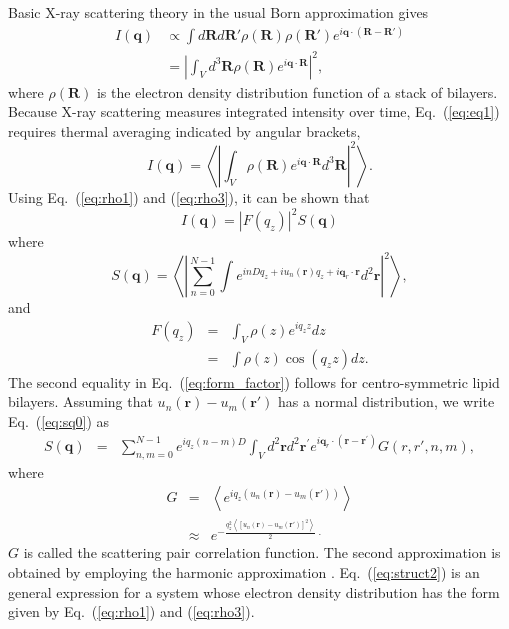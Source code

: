 Basic X-ray scattering theory in the usual Born approximation gives
\begin{align}
  I\left(\mathbf{q}\right) &\propto \int d\mathbf{R}d\mathbf{R}' 
  \rho(\mathbf{R})\rho (\mathbf{R}')e^{i\mathbf{q}\cdot (\mathbf{R}-\mathbf{R}')}\nonumber \\
  & = \left|\int_V d^{3}\mathbf{R} \rho \left(\mathbf{R}\right)e^{i\mathbf{q}\cdot \mathbf{R}}
  \right|^{2},\label{eq:eq1}
\end{align}
where $\rho \left(\mathbf{R}\right)$ is the electron density distribution
function of a stack of bilayers. 
Because X-ray scattering measures integrated intensity over time, 
Eq.~(\ref{eq:eq1}) requires thermal averaging indicated by angular brackets, 
\begin{equation}
  I\left(\mathbf{q}\right)=\left\langle \left|\int _{V}\rho \left(\mathbf{R}\right)e^{i\mathbf{q}\cdot \mathbf{R}}d^{3}\mathbf{R}\right|^{2}\right\rangle .\label{eq:int2}
\end{equation}
Using Eq.~(\ref{eq:rho1}) and (\ref{eq:rho3}), it can be shown that \cite{Liu03}
\begin{equation}
  I\left(\mathbf{q}\right) = \left|F(q_{z})\right|^{2}S\left(\mathbf{q}\right)
  \label{eq:factor1}
\end{equation}
where
\begin{equation}
  S\left(\mathbf{q}\right)=\left\langle \left|\sum _{n=0}^{N-1}\int e^{inDq_{z}+iu_{n}\left(\mathbf{r}\right)q_{z}+i\mathbf{q}_{r}\cdot \mathbf{r}}d^{2}\mathbf{r}\right|^{2}\right\rangle,
  \label{eq:sq0}
\end{equation}
and
\begin{eqnarray}
  F(q_{z}) & = & \int _{V}\rho \left(z\right)e^{iq_{z}z}dz\nonumber \\
  & = & \int \rho \left(z\right)\cos (q_{z}z)dz.
  \label{eq:form_factor}
\end{eqnarray}
The second equality in Eq.~(\ref{eq:form_factor}) follows for centro-symmetric lipid bilayers.
Assuming that $u_n(\mathbf{r})-u_m(\mathbf{r'})$ has a normal distribution,
we write Eq.~(\ref{eq:sq0}) as
\begin{eqnarray}
  S\left(\mathbf{q}\right) & = & \sum _{n,m=0}^{N-1}e^{iq_{z}(n-m)D}\int _{V}d^{2}\mathbf{r}d^{2}\mathbf{r}^{\prime }e^{i\mathbf{q}_{r}\cdot \left(\mathbf{r-r}^{\prime }\right)}G(r,r',n,m),
  \label{eq:struct2}
\end{eqnarray}
where 
\begin{eqnarray}
  G & = & \left\langle e^{iq_{z}\left(u_{n}\left(\mathbf{r}\right)-u_{m}(\mathbf{r}')\right)}\right\rangle \nonumber \\
  & \approx & e^{-\frac{q_{z}^{2}\left\langle \left[u_{n}\left(\mathbf{r}\right)-u_{m}(\mathbf{r}')\right]^{2}\right\rangle }{2}\; .}
  \label{eq:G}
\end{eqnarray}
$G$ is called the scattering pair correlation function. The second approximation 
is obtained by employing the harmonic approximation \cite{Liu03}. 
Eq.~(\ref{eq:struct2}) is an general expression for a system whose electron
density distribution has the form given by Eq.~(\ref{eq:rho1}) and (\ref{eq:rho3}).

